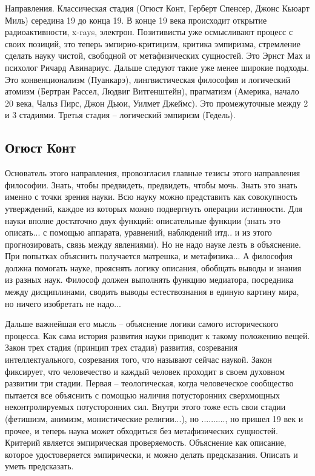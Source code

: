 \documentclass[a4paper, 12pt]{article}
\begin{document}
Направления. Классическая стадия (Огюст Конт, Герберт Спенсер, Джонс 
Кьюарт Миль) середина 19 до конца 19. В конце 19 века происходит 
открытие радиоактивности, x-rays, электрон. Позитивисты уже осмысливают 
процесс с своих позиций, это теперь эмпирио-критицизм, критика 
эмпиризма, стремление сделать науку чистой, свободной от метафизических 
сущностей. Это Эрнст Мах и психолог Ричард Авинариус. Дальше следуют 
такие уже менее широкие подходы. Это конвенционализм (Пуанкарэ), 
лингвистическая философия и логический атомизм (Бертран Рассел, Людвиг 
Витгенштейн), прагматизм (Америка, начало 20 века, Чальз Пирс, Джон 
Дьюи, Уилмет Джеймс). Это промежуточные между 2 и 3 стадиями. Третья 
стадия -- логический эмпиризм (Гедель).

\subsection{Огюст Конт}

Основатель этого направления, провозгласил главные тезисы этого 
направления философии. Знать, чтобы предвидеть, предвидеть, чтобы мочь. 
Знать это знать именно с точки зрения науки. Всю науку можно представить 
как совокупность утверждений, каждое из которых можно подвергнуть 
операции истинности. Для науки вполне достаточно двух функций: 
описательные функции (знать это описать... с помощью аппарата, 
уравнений, наблюдений итд.. и из этого прогнозировать, связь между 
явлениями). Но не надо науке лезть в объяснение. При попытках объяснить 
получается матрешка, и метафизика... А философия должна помогать науке, 
прояснять логику описания, обобщать выводы и знания из разных наук. 
Философ должен выполнять функцию медиатора, посредника между 
дисциплинами, сводить выводы естествознания в единую картину мира, но 
ничего изобретать не надо...

Дальше важнейшая его мысль -- объяснение логики самого исторического 
процесса. Как сама история развития науки приводит к такому положению 
вещей. Закон трех стадия (принцип трех стадия) развития, созревания 
интеллектуального, созревания того, что называют сейчас наукой. Закон 
фиксирует, что человечество и каждый человек проходит в своем духовном 
развитии три стадии. Первая -- теологическая, когда человеческое 
сообщество пытается все объяснить с помощью наличия потусторонних 
сверхмощных неконтролируемых потусторонних сил. Внутри этого тоже есть 
свои стадии (фетишизм, анимизм, монистические религии...), но 
.........., но пришел 19 век и прочее, и теперь наука может обходиться 
без метафизических сущностей. Критерий является эмпирическая 
проверяемость. Объяснение как описание, которое удостоверяется 
эмпирически, и можно делать предсказания. Описать и уметь предсказать.
\end{document}
